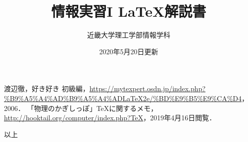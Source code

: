 \documentclass[a4j]{jsarticle}
\begin{document}
\title{情報実習I \LaTeX 解説書}
\date{2020年5月20日更新}
\author{近畿大学理工学部情報学科}

\maketitle








\begin{thebibliography}{1}
    渡辺徹，好き好き \LaTeXe 初級編，\url{https://mytexpert.osdn.jp/index.php?%B9%A5%A4%AD%B9%A5%A4%ADLaTeX2e/%BD%E9%B5%E9%CA%D4}，2006．
    「物理のかぎしっぽ」\TeX に関するメモ，\url{http://hooktail.org/computer/index.php?TeX}，2019年4月16日閲覧．
\end{thebibliography}

\begin{flushright}
以上
\end{flushright}
\end{document}
